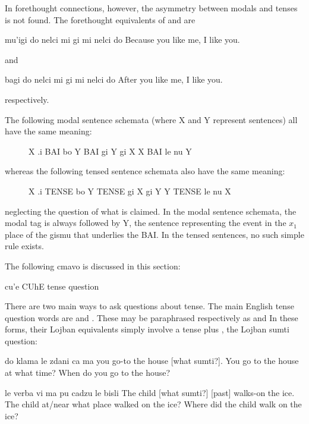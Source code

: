 In forethought connections, however, the asymmetry between
    modals and tenses is not found. The forethought equivalents of and  are
\begin{example}
mu'igi do nelci mi gi mi nelci do\n
Because you like me, I like you.
\end{example}

{\noindent}and
\begin{example}
bagi do nelci mi gi mi nelci do\n
After you like me, I like you.
\end{example}

{\noindent}respectively. 

The following modal sentence schemata (where X and Y
    represent sentences) all have the same meaning:
\begin{description}
\item[] X .i BAI bo Y BAI gi Y gi X X BAI le nu Y
\end{description}

whereas the following tensed sentence schemata also have the
    same meaning: 
\begin{description}
\item[] X .i TENSE bo Y TENSE gi X gi Y Y TENSE le nu X
\end{description}

neglecting the question of what is claimed. In the modal
    sentence schemata, the modal tag is always followed by Y, the
    sentence representing the event in the $x_1$ place of the gismu
    that underlies the BAI. In the tensed sentences, no such simple
    rule exists.




The following cmavo is discussed in this section:

   cu'e    CUhE    tense question

There are two main ways to ask questions about tense. The main
    English tense question words are  and .
    These may be paraphrased respectively as  and
     In these forms, their Lojban equivalents
    simply involve a tense plus , the Lojban sumti question:
\begin{example}
do klama le zdani ca ma\n
you go-to the house  [what sumti?].\n
You go to the house at what time?\n
When do you go to the house?
\end{example}

\begin{example}
le verba vi ma pu\n
\T	cadzu le bisli\n
The child  [what sumti?] [past]\n
\T	walks-on the ice.\n
The child at/near what place walked on the ice?\n
Where did the child walk on the ice?
\end{example}

